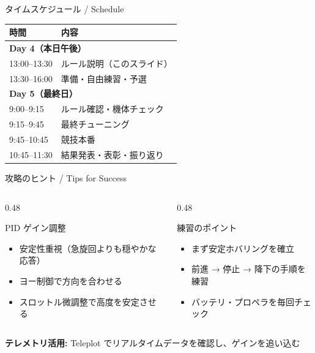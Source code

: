 \documentclass[aspectratio=169, 14pt]{beamer}
\begin{document}
\begin{frame}{タイムスケジュール / Schedule}
  \centering
  \begin{tabular}{ll}
    \hline
    \textbf{時間} & \textbf{内容} \\
    \hline
    \multicolumn{2}{l}{\textbf{Day 4（本日午後）}} \\
    13:00--13:30 & ルール説明（このスライド） \\
    13:30--16:00 & 準備・自由練習・予選 \\
    \hline
    \multicolumn{2}{l}{\textbf{Day 5（最終日）}} \\
    \phantom{0}9:00--\phantom{0}9:15 & ルール確認・機体チェック \\
    \phantom{0}9:15--\phantom{0}9:45 & 最終チューニング \\
    \phantom{0}9:45--10:45 & 競技本番 \\
    10:45--11:30 & 結果発表・表彰・振り返り \\
    \hline
  \end{tabular}
\end{frame}

\begin{frame}{攻略のヒント / Tips for Success}
  \begin{columns}[t]
    \begin{column}{0.48\textwidth}
      \begin{exampleblock}{PID ゲイン調整}
        \begin{itemize}
          \item 安定性重視（急旋回よりも穏やかな応答）
          \item ヨー制御で方向を合わせる
          \item スロットル微調整で高度を安定させる
        \end{itemize}
      \end{exampleblock}
    \end{column}
    \begin{column}{0.48\textwidth}
      \begin{exampleblock}{練習のポイント}
        \begin{itemize}
          \item まず安定ホバリングを確立
          \item 前進 → 停止 → 降下の手順を練習
          \item バッテリ・プロペラを毎回チェック
        \end{itemize}
      \end{exampleblock}
    \end{column}
  \end{columns}

  \smallskip
  {\small \textbf{テレメトリ活用:}
    Teleplot でリアルタイムデータを確認し、ゲインを追い込む}
\end{frame}
\end{document}
